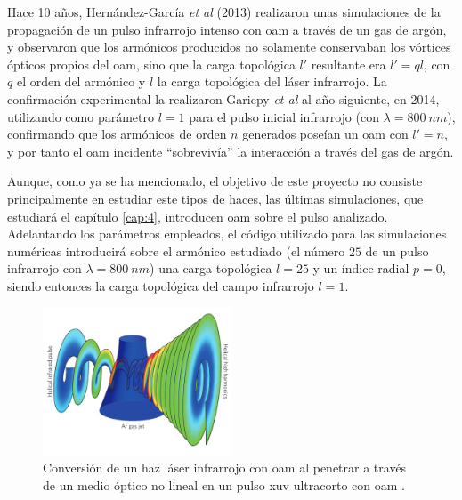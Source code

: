 Hace 10 años, Hernández-García \emph{et al} (2013) \autocite{Hernandez-Garcia2013} realizaron unas simulaciones de la propagación de un pulso infrarrojo intenso con \acrshort{oam} a través de un gas de argón, y observaron que los armónicos producidos no solamente conservaban los vórtices ópticos propios del \acrshort{oam}, sino que la carga topológica $l \prime $ resultante era $l \prime =q l$, con $q$ el orden del armónico y $l$ la carga topológica del láser infrarrojo. La confirmación experimental la realizaron Gariepy \emph{et al} \autocite{Gariepy2014} al año siguiente, en 2014, utilizando como parámetro $l=1$ para el pulso inicial infrarrojo (con $\lambda = \qty{800}{nm}$), confirmando que los armónicos de orden $n$ generados poseían un \acrshort{oam} con $l \prime = n$, y por tanto el \acrshort{oam} incidente \enquote{sobrevivía} la interacción a través del gas de argón.

Aunque, como ya se ha mencionado, el objetivo de este proyecto no consiste principalmente en estudiar este tipos de haces, las últimas simulaciones, que estudiará el capítulo \ref{cap:4}, introducen \acrshort{oam} sobre el pulso analizado. Adelantando los parámetros empleados, el código utilizado para las simulaciones numéricas introducirá sobre el armónico estudiado (el número $25$ de un pulso infrarrojo con $\lambda = \qty{800}{nm}$) una carga topológica $l=25$ y un índice radial $p=0$, siendo entonces la carga topológica del campo infrarrojo $l=1$.

\begin{figure}[htbp]
  \centering
  \includegraphics[width=0.5\textwidth]{Figuras/ch1_twist.png}
  \caption{Conversión de un haz láser infrarrojo con \acrshort{oam} al penetrar a través de un medio óptico no lineal en un pulso \acrshort{xuv} ultracorto con \acrshort{oam} \autocite{Patchkovskii2012}.}
  \label{fig:1.21}
\end{figure}

